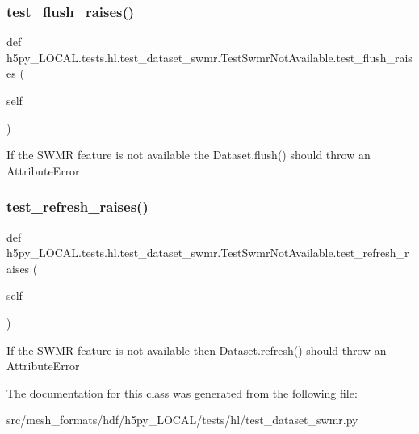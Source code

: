 \subsubsection{\texorpdfstring{test\+\_\+flush\+\_\+raises()}{test\_flush\_raises()}}
{\footnotesize\ttfamily def h5py\+\_\+\+L\+O\+C\+A\+L.\+tests.\+hl.\+test\+\_\+dataset\+\_\+swmr.\+Test\+Swmr\+Not\+Available.\+test\+\_\+flush\+\_\+raises (\begin{DoxyParamCaption}\item[{}]{self }\end{DoxyParamCaption})}

\begin{DoxyVerb}If the SWMR feature is not available the Dataset.flush() should 
throw an AttributeError
\end{DoxyVerb}
 \mbox{\label{classh5py__LOCAL_1_1tests_1_1hl_1_1test__dataset__swmr_1_1TestSwmrNotAvailable_a712cac7776ebb269de1eba50e865ae22}} 
\subsubsection{\texorpdfstring{test\+\_\+refresh\+\_\+raises()}{test\_refresh\_raises()}}
{\footnotesize\ttfamily def h5py\+\_\+\+L\+O\+C\+A\+L.\+tests.\+hl.\+test\+\_\+dataset\+\_\+swmr.\+Test\+Swmr\+Not\+Available.\+test\+\_\+refresh\+\_\+raises (\begin{DoxyParamCaption}\item[{}]{self }\end{DoxyParamCaption})}

\begin{DoxyVerb}If the SWMR feature is not available then Dataset.refresh() should throw an AttributeError
\end{DoxyVerb}
 

The documentation for this class was generated from the following file\+:\begin{DoxyCompactItemize}
\item 
src/mesh\+\_\+formats/hdf/h5py\+\_\+\+L\+O\+C\+A\+L/tests/hl/test\+\_\+dataset\+\_\+swmr.\+py\end{DoxyCompactItemize}
